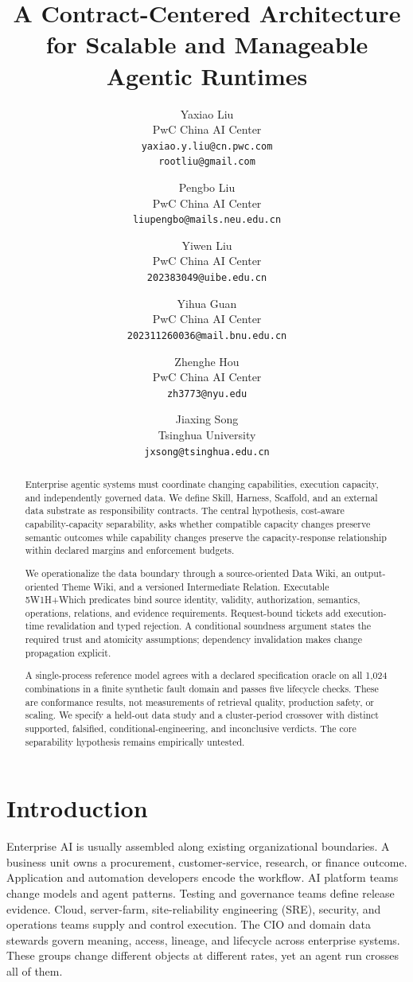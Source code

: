 \documentclass[11pt]{article}
\title{A Contract-Centered Architecture for Scalable and Manageable Agentic Runtimes}
\author{%
Yaxiao Liu\\
PwC China AI Center\\
\texttt{yaxiao.y.liu@cn.pwc.com}\\
\texttt{rootliu@gmail.com}
\and
Pengbo Liu\\
PwC China AI Center\\
\texttt{liupengbo@mails.neu.edu.cn}
\and
Yiwen Liu\\
PwC China AI Center\\
\texttt{202383049@uibe.edu.cn}
\and
Yihua Guan\\
PwC China AI Center\\
\texttt{202311260036@mail.bnu.edu.cn}
\and
Zhenghe Hou\\
PwC China AI Center\\
\texttt{zh3773@nyu.edu}
\and
Jiaxing Song\\
Tsinghua University\\
\texttt{jxsong@tsinghua.edu.cn}
}
\date{}
\begin{document}
\maketitle

\begin{abstract}

Enterprise agentic systems must coordinate changing capabilities, execution capacity, and independently governed data. We define Skill, Harness, Scaffold, and an external data substrate as responsibility contracts. The central hypothesis, cost-aware capability-capacity separability, asks whether compatible capacity changes preserve semantic outcomes while capability changes preserve the capacity-response relationship within declared margins and enforcement budgets.

We operationalize the data boundary through a source-oriented Data Wiki, an output-oriented Theme Wiki, and a versioned Intermediate Relation. Executable 5W1H+Which predicates bind source identity, validity, authorization, semantics, operations, relations, and evidence requirements. Request-bound tickets add execution-time revalidation and typed rejection. A conditional soundness argument states the required trust and atomicity assumptions; dependency invalidation makes change propagation explicit.

A single-process reference model agrees with a declared specification oracle on all 1,024 combinations in a finite synthetic fault domain and passes five lifecycle checks. These are conformance results, not measurements of retrieval quality, production safety, or scaling. We specify a held-out data study and a cluster-period crossover with distinct supported, falsified, conditional-engineering, and inconclusive verdicts. The core separability hypothesis remains empirically untested.

\end{abstract}

\section{Introduction}
\label{sec:introduction}

Enterprise AI is usually assembled along existing organizational boundaries. A business unit owns a procurement, customer-service, research, or finance outcome. Application and automation developers encode the workflow. AI platform teams change models and agent patterns. Testing and governance teams define release evidence. Cloud, server-farm, site-reliability engineering (SRE), security, and operations teams supply and control execution. The CIO and domain data stewards govern meaning, access, lineage, and lifecycle across enterprise systems. These groups change different objects at different rates, yet an agent run crosses all of them.
\end{document}
